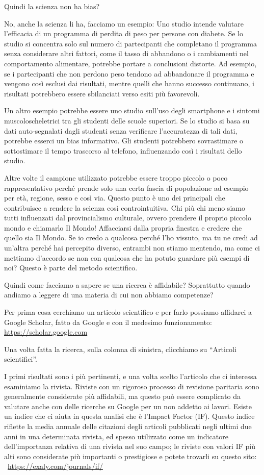 \documentclass[12pt]{book} %
\begin{document}
Quindi la scienza non ha bias?

No, anche la scienza li ha, facciamo un esempio: Uno studio intende valutare l'efficacia di un
programma di perdita di peso per persone con diabete. Se lo studio si concentra solo sul numero di partecipanti che
completano il programma senza considerare altri fattori, come il tasso di abbandono o i cambiamenti nel comportamento
alimentare, potrebbe portare a conclusioni distorte. Ad esempio, se i partecipanti che non perdono peso tendono ad
abbandonare il programma e vengono così esclusi dai risultati, mentre quelli che hanno successo continuano, i risultati
potrebbero essere sbilanciati verso esiti più favorevoli.

Un altro esempio potrebbe essere uno studio sull'uso degli smartphone e i sintomi
muscoloscheletrici tra gli studenti delle scuole superiori. Se lo studio si basa su dati auto-segnalati dagli studenti
senza verificare l'accuratezza di tali dati, potrebbe esserci un bias informativo. Gli studenti
potrebbero sovrastimare o sottostimare il tempo trascorso al telefono, influenzando così i risultati dello studio.

Altre volte il campione utilizzato potrebbe essere troppo piccolo o poco rappresentativo perché prende solo una certa fascia di popolazione ad esempio per età, regione, sesso e così via. Questo punto è uno dei principali che contribuisce a rendere la scienza così controintuitiva. Chi più chi meno siamo tutti influenzati dal provincialismo culturale, ovvero prendere il proprio piccolo mondo e chiamarlo Il Mondo! Affacciarsi dalla propria finestra e credere che quello sia Il Mondo. Se io credo a qualcosa perché l'ho vissuto, ma tu ne credi ad un'altra perché hai percepito diverso, entrambi non stiamo mentendo, ma come ci mettiamo d'accordo se non con qualcosa che ha potuto guardare più esempi di noi? Questo è parte del metodo scientifico.

Quindi come facciamo a sapere se una ricerca è affidabile? Soprattutto quando andiamo a leggere di una materia di cui
non abbiamo competenze?

Per prima cosa cerchiamo un articolo scientifico e per farlo possiamo affidarci a Google Scholar, fatto da Google e con
il medesimo funzionamento: \url{https://scholar.google.com}

Una volta fatta la ricerca, sulla colonna di sinistra, clicchiamo su “Articoli scientifici”.

I primi risultati sono i più pertinenti, e una volta scelto l'articolo che ci interessa esaminiamo
la rivista. Riviste con un rigoroso processo di revisione paritaria sono generalmente considerate più affidabili, ma
questo può essere complicato da valutare anche con delle ricerche su Google per un non addetto ai lavori. Esiste un
indice che ci aiuta in questa analisi che è l'Impact Factor (IF). Questo indice riflette la media
annuale delle citazioni degli articoli pubblicati negli ultimi due anni in una determinata rivista, ed spesso
utilizzato come un indicatore dell'importanza relativa di una rivista nel suo campo; le riviste
con valori IF più alti sono considerate più importanti o prestigiose e potete trovarli su questo sito:
\ \url{https://exaly.com/journals/if/}
\end{document}
